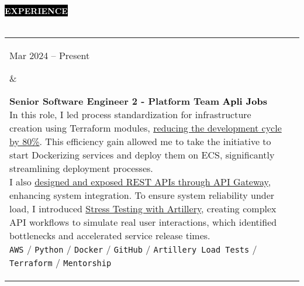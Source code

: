 \documentclass[10pt,A4]{article}
\makeatletter
\newcounter{a}
\newcounter{b}
\newcounter{c}
\newcommand{\cvsection}[1] {
	\textcolor{white}{\MakeUppercase{\textbf{#1}}}
}
\newcommand{\cvsect}[1]{
	\colorbox{black}{{\cvsection{#1}}}\\\\%
}
\newenvironment{entrylist}{%
	\begin{tabular*}{\textwidth}[t]{@{\extracolsep{\fill}}ll}
	}{%
	\end{tabular*}
}
\newcommand{\entry}[4]{%
	\parbox[t]{3.5cm}{%
		#1%
	}%
	&\parbox[t]{14cm}{%
		\textbf{#2}%
		\hfill%
		{\footnotesize \textbf{\textcolor{black}{#3}}}\\%
		#4%
	}\\\\}
\newcommand{\slashsep}{
	\hspace{2mm}/\hspace{2mm}
}
\makeatother
\begin{document}
	\cvsect{Experience}
	\begin{entrylist}
		\entry
		{Mar 2024 – Present}
		{Senior Software Engineer 2 - Platform Team}
		{Apli Jobs} %
		{In this role, I led process standardization for infrastructure creation using Terraform modules,
		\underline{reducing the development cycle by 80\%}. This efficiency gain allowed me to take the initiative to
		start Dockerizing services and deploy them on ECS, significantly streamlining deployment processes.\\
		\hfil\break
		I also \underline{designed and exposed REST APIs through API Gateway}, enhancing system integration. To ensure
		system reliability under load, I introduced \underline{Stress Testing with Artillery}, creating complex API
		workflows to simulate real user interactions, which identified bottlenecks and accelerated service
		release times.\\
			\texttt{AWS}\slashsep\texttt{Python}\slashsep\texttt{Docker}\slashsep\texttt{GitHub}\slashsep\texttt{Artillery Load Tests}\slashsep\texttt{Terraform}\slashsep\texttt{Mentorship}}
		\entry
		{Jan 2022 – Mar 2024}
		{Software Engineer - Cloud Team}
		{Apli Jobs}
		{As the first and only Cloud Engineer during my initial 6 months at Apli, I spearheaded the design
		and \underline{implementation of cloud-based architecture for cross-team projects}, collaborating with Data Science,
		Product, and Engineering teams. Utilizing AWS services such as EMR, ECS, DynamoDB, Lambda, AWS Backup,
		RDS, and Redis, I also successfully implemented cost optimization mechanisms that \underline{reduced the company's costs in around 10\% for the first year}.\\
		\hfil\break
		I initiated and led internal efforts to bolster company culture and enforce security protocols.
		I was a \underline{key member of the committee that introduced the on-call program} to the Engineering team, which
		resulted in a response time against incident of less than 4 hours. I also led the ISO audit and
		certification process for cloud infrastructure controls, ensuring our architecture met the highest standards of security, 
		scalability, and reliability, which culminated in achieving ISO 27k1.\\
		\hfil\break
		As the team expanded, \underline{I took on a mentor and leadership role}, establishing processes that improved
		code quality, including enhanced documentation, automated security checks in CI/CD, and regular
		knowledge-sharing meetings.\\
}
\end{entrylist}
\end{document}
